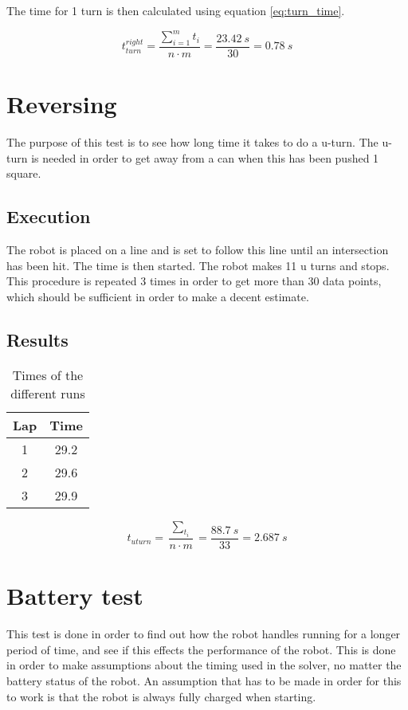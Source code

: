 \documentclass[a4paper,10pt]{article}
\begin{document}
The time for 1 turn is then calculated using equation \ref{eq:turn_time}.

$$
t_{turn}^{right} = \frac{\sum^{m}_{i=1}t_i}{n\cdot m} = \frac{23.42\ s}{30} = 0.78\ s
$$

\section{Reversing}
The purpose of this test is to see how long time it takes to do a u-turn. The u-turn is needed in order to get away from a can when this has been pushed 1 square.

\subsection{Execution}
The robot is placed on a line and is set to follow this line until an intersection has been hit. The time is then started. The robot makes 11 u turns and stops. This procedure is repeated 3 times in order to get more than 30 data points, which should be sufficient in order to make a decent estimate.

\subsection{Results}

\begin{table} [H]
\centering
 \begin{tabular}{|c|c|}
  \hline Lap & Time \\ \hline
  1  & 29.2  \\  \hline
  2  & 29.6  \\  \hline
  3  & 29.9  \\  \hline
 \end{tabular}
 \caption{Times of the different runs}
 \label{tab:time_uturn}
\end{table}

$$
t_{uturn} = \frac{\sum_{t_i}}{n\cdot m} = \frac{88.7\ s}{33} = 2.687\ s
$$

\section{Battery test}
This test is done in order to find out how the robot handles running for a longer period of time, and see if this effects the performance of the robot. This is done in order to make assumptions about the timing used in the solver, no matter the battery status of the robot. An assumption that has to be made in order for this to work is that the robot is always fully charged when starting.
\end{document}
